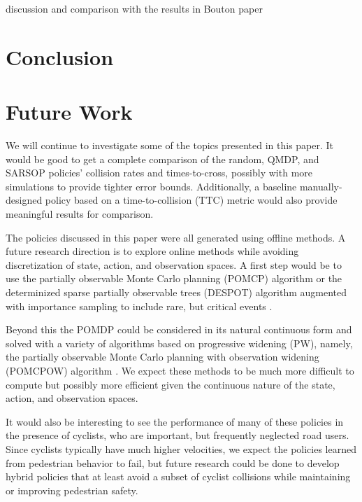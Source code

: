 \documentclass[conference]{IEEEtran}
\begin{document}
discussion and comparison with the results in Bouton paper

\section{Conclusion}
\label{sec:conclusion}


\section{Future Work}
\label{sec:future-work}

We will continue to investigate some of the topics presented in this paper. It would be good to get a complete comparison of the random, QMDP, and SARSOP policies' collision rates and times-to-cross, possibly with more simulations to provide tighter error bounds. Additionally, a baseline manually-designed policy based on a time-to-collision (TTC) metric would also provide meaningful results for comparison.

The policies discussed in this paper were all generated using offline methods. A future research direction is to explore online methods while avoiding discretization of state, action, and observation spaces. A first step would be to use the partially observable Monte Carlo planning (POMCP) algorithm \cite{Silver2010Monte-CarloPOMDPs} or the determinized sparse partially observable trees (DESPOT) algorithm augmented with importance sampling to include rare, but critical events \cite{Ye2017DESPOT:Regularization, Luo2019ImportanceUncertainty}. 

Beyond this the POMDP could be considered in its natural continuous form and solved with a variety of algorithms based on progressive widening (PW), namely, the partially observable Monte Carlo planning with observation widening (POMCPOW) algorithm \cite{Sunberg2018OnlineSpaces}. We expect these methods to be much more difficult to compute but possibly more efficient given the continuous nature of the state, action, and observation spaces.

It would also be interesting to see the performance of many of these policies in the presence of cyclists, who are important, but frequently neglected road users. Since cyclists typically have much higher velocities, we expect the policies learned from pedestrian behavior to fail, but future research could be done to develop hybrid policies that at least avoid a subset of cyclist collisions while maintaining or improving pedestrian safety.



\end{document}
